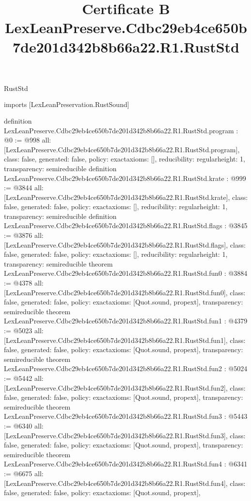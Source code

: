 \begin{lexlean}{RustStd}
\title{Certificate B LexLeanPreserve.Cdbc29eb4ce650b7de201d342b8b66a22.R1.RustStd}
\begin{coremodule}
imports [LexLeanPreservation.RustSound]

definition LexLeanPreserve.Cdbc29eb4ce650b7de201d342b8b66a22.R1.RustStd.program : @0 := @998 {
  all: [LexLeanPreserve.Cdbc29eb4ce650b7de201d342b8b66a22.R1.RustStd.program],
  class: false,
  generated: false,
  policy: exact{axioms: []},
  reducibility: regular{height: 1},
  transparency: semireducible
}
definition LexLeanPreserve.Cdbc29eb4ce650b7de201d342b8b66a22.R1.RustStd.krate : @999 := @3844 {
  all: [LexLeanPreserve.Cdbc29eb4ce650b7de201d342b8b66a22.R1.RustStd.krate],
  class: false,
  generated: false,
  policy: exact{axioms: []},
  reducibility: regular{height: 1},
  transparency: semireducible
}
definition LexLeanPreserve.Cdbc29eb4ce650b7de201d342b8b66a22.R1.RustStd.flags : @3845 := @3876 {
  all: [LexLeanPreserve.Cdbc29eb4ce650b7de201d342b8b66a22.R1.RustStd.flags],
  class: false,
  generated: false,
  policy: exact{axioms: []},
  reducibility: regular{height: 1},
  transparency: semireducible
}
theorem LexLeanPreserve.Cdbc29eb4ce650b7de201d342b8b66a22.R1.RustStd.fun0 : @3884 := @4378 {
  all: [LexLeanPreserve.Cdbc29eb4ce650b7de201d342b8b66a22.R1.RustStd.fun0],
  class: false,
  generated: false,
  policy: exact{axioms: [Quot.sound, propext]},
  transparency: semireducible
}
theorem LexLeanPreserve.Cdbc29eb4ce650b7de201d342b8b66a22.R1.RustStd.fun1 : @4379 := @5023 {
  all: [LexLeanPreserve.Cdbc29eb4ce650b7de201d342b8b66a22.R1.RustStd.fun1],
  class: false,
  generated: false,
  policy: exact{axioms: [Quot.sound, propext]},
  transparency: semireducible
}
theorem LexLeanPreserve.Cdbc29eb4ce650b7de201d342b8b66a22.R1.RustStd.fun2 : @5024 := @5442 {
  all: [LexLeanPreserve.Cdbc29eb4ce650b7de201d342b8b66a22.R1.RustStd.fun2],
  class: false,
  generated: false,
  policy: exact{axioms: [Quot.sound, propext]},
  transparency: semireducible
}
theorem LexLeanPreserve.Cdbc29eb4ce650b7de201d342b8b66a22.R1.RustStd.fun3 : @5443 := @6340 {
  all: [LexLeanPreserve.Cdbc29eb4ce650b7de201d342b8b66a22.R1.RustStd.fun3],
  class: false,
  generated: false,
  policy: exact{axioms: [Quot.sound, propext]},
  transparency: semireducible
}
theorem LexLeanPreserve.Cdbc29eb4ce650b7de201d342b8b66a22.R1.RustStd.fun4 : @6341 := @6675 {
  all: [LexLeanPreserve.Cdbc29eb4ce650b7de201d342b8b66a22.R1.RustStd.fun4],
  class: false,
  generated: false,
  policy: exact{axioms: [Quot.sound, propext]},
}
\end{coremodule}
\end{lexlean}
